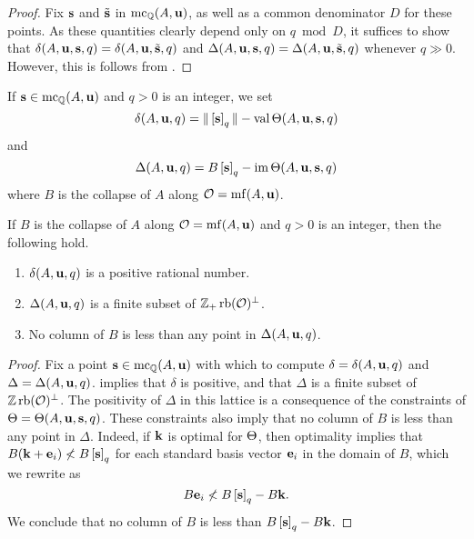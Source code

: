 \documentclass[11pt]{amsart}
\renewcommand{\!}[1]{{\color{red}\text{$\star$\,}#1\,$\star$}}
\begin{document}
\begin{proof}
Fix $\mathbf{s}$ and $\tilde{\mathbf{s}}$ in $\operatorname{mc}_{\mathbb{Q}}(A, \mathbf{u})$, as well as a common denominator $D$ for these points.  As these quantities clearly depend only on $q \bmod D$, it suffices to show that $\delta(A, \mathbf{u}, \mathbf{s}, q) = \delta(A, \mathbf{u}, \tilde{\mathbf{s}}, q)$  and $ \Delta(A, \mathbf{u}, \mathbf{s}, q) = \Delta(A, \mathbf{u}, \tilde{\mathbf{s}}, q)$ whenever $q \gg 0$.  However, this is follows from .
\end{proof}

\begin{definition}  
\label{independence: D}  
If $\mathbf{s} \in \operatorname{mc}_{\mathbb{Q}}(A, \mathbf{u})$ and $q>0$ is an integer, we set \[ \delta(A, \mathbf{u}, q) = \| \left[ \mathbf{s} \right]_q \|  - \operatorname{val} \Theta(A, \mathbf{u}, \mathbf{s}, q)\] and 
\[\Delta(A, \mathbf{u}, q) = B \left[ \mathbf{s} \right]_q - \operatorname{im}  \Theta( A, \mathbf{u}, \mathbf{s}, q)  \]
where $B$ is the collapse of $A$ along $\mathcal{O} = \operatorname{mf}(A, \mathbf{u})$. 
\end{definition}


\begin{lemma}  
\label{independence: L}  
If $B$ is the collapse of $A$ along $\mathcal{O} = \operatorname{mf}(A, \mathbf{u})$ and $q>0$ is an integer, then the following hold.

\begin{enumerate}
\item $\delta(A, \mathbf{u}, q)$  is a positive rational number.
\item $\Delta(A, \mathbf{u}, q)$ is a finite subset of $\mathbb{Z}_+\operatorname{rb}(\mathcal{O})^{\perp}$.
\item No column of $B$ is less than any point in $\Delta(A, \mathbf{u}, q)$.
\end{enumerate}
\end{lemma}

\begin{proof} 
Fix a point $\mathbf{s} \in \operatorname{mc}_{\mathbb{Q}}(A, \mathbf{u})$ with which to compute $\delta = \delta(A, \mathbf{u}, q)$ and $\Delta = \Delta(A, \mathbf{u}, q)$.   implies that $\delta$ is positive, and  that $\Delta$ is a finite subset of $\mathbb{Z} \operatorname{rb}(\mathcal{O})^{\perp}$.   The positivity of $\Delta$ in this lattice is a consequence of the constraints of $\Theta = \Theta(A, \mathbf{u}, \mathbf{s}, q)$.  These constraints also imply that no column of $B$ is less than any point in $\Delta$.  Indeed, if $\mathbf{k}$ is optimal for $\Theta$, then optimality implies that  $B( \mathbf{k} + \mathbf{e}_i) \not < B \left[ \mathbf{s} \right]_q$ for each standard basis vector $\mathbf{e}_i$ in the domain of $B$, which we rewrite as  \[ B \mathbf{e}_i \not < B \left[ \mathbf{s} \right]_q - B \mathbf{k}.\] 
We conclude that no column of $B$ is less than $B\left[ \mathbf{s} \right]_q - B\mathbf{k}$.
\end{proof}
\end{document}
